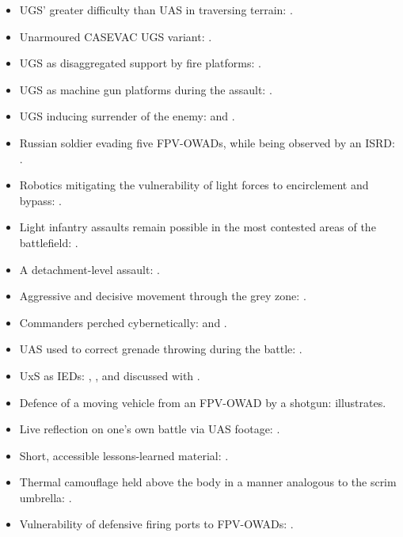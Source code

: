 \begin{itemize}
	\item UGS' greater difficulty than UAS in traversing terrain: \textcite{ombr_63_2026_03_13_casevac}.
	\item Unarmoured CASEVAC UGS variant: \textcite{tretii_armiiskyi_korpus_2023_2_13_CASEVAC}.
	\item UGS as disaggregated support by fire platforms: \textcite{tretii_armiiskyi_korpus_2025_09_02_ground_robot_unit}.
	\item UGS as machine gun platforms during the assault: \textcite{II_mechanized_battalion_ab3_2026_03_22_nrk_turret_forward_edge}.
	\item UGS inducing surrender of the enemy: \textcite{DevDroid_TW762} and \textcite{MODUKR_drone_surrender}.
	\item Russian soldier evading five FPV-OWADs, while being observed by an ISRD: \textcite[9:36--10:38]{fpv_scatter_analysis}. 
	\item Robotics mitigating the vulnerability of light forces to encirclement and bypass: \textcite{Kirichenko_2026B}.
	\item Light infantry assaults remain possible in the most contested areas of the battlefield: \textcite{revanche_telegram_stepnohirsk_2026_2_10}.
	\item A detachment-level assault: \textcite{blue_2_2026_1_13}.
	\item Aggressive and decisive movement through the grey zone: \textcite{Chosen_2024_10_17}.
	\item Commanders perched cybernetically: \textcite[6:33--8:43]{civdiv_6} and \textcite{Dogwoof_2000m_Andriivka}.
	\item UAS used to correct grenade throwing during the battle: \textcite{Chosen_2024_10_17}.
	\item UxS as IEDs: \textcite{civdiv_7,magyar_telegram_iedmaking}, \textcite{civdiv}, \textcite[7:30--7:37]{civdiv_2} and discussed with \textcite{danny_participant_5}.
	\item Defence of a moving vehicle from an FPV-OWAD by a shotgun: \textcite[0:16--0:50]{civdiv_11} illustrates.
	\item Live reflection on one's own battle via UAS footage: \parencite{Dave_2024_3_22,hallatt_2024_03_13_1}.
	\item Short, accessible lessons-learned material: \textcite{uKR_LESSONS_LEARNED_1}.
	\item Thermal camouflage held above the body in a manner analogous to the scrim umbrella:  \textcite[0:00--0:35]{civdiv_11}.
	\item Vulnerability of defensive firing ports to FPV-OWADs: \textcite{azov_media_2025_05_28_assault,mod_russia_telegram_attack_bunker}.
\end{itemize}

